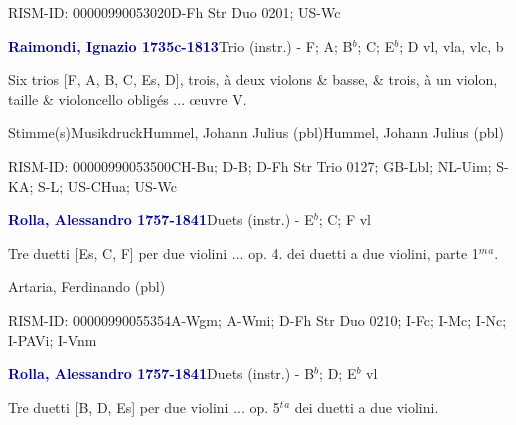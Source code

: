 \documentclass[twocolumn]{book}
\begin{document}
\par RISM-ID: 00000990053020\newline D-Fh  Str Duo 0201; US-Wc
\par \vspace{7pt} \textcolor{darkblue}{\textbf{Raimondi, Ignazio  1735c-1813}}\hfillplus{\textbf{[318]}}\newline Trio (instr.) - F; A; B$^b$; C; E$^b$; D vl, vla, vlc, b
\par \begin{itshape}Six trios [F, A, B, C, Es, D], trois, à deux violons \& basse, \& trois, à un violon, taille \& violoncello obligés ... œuvre V.\end{itshape} 
\par \textcolor{darkblue}{}  Stimme(s)\newline Musikdruck\newline Hummel, Johann Julius  (pbl)\newline Hummel, Johann Julius  (pbl)
\par RISM-ID: 00000990053500\newline CH-Bu; D-B; D-Fh  Str Trio 0127; GB-Lbl; NL-Uim; S-KA; S-L; US-CHua; US-Wc
\par \vspace{7pt} \textcolor{darkblue}{\textbf{Rolla, Alessandro  1757-1841}}\hfillplus{\textbf{[319]}}\newline Duets (instr.) - E$^b$; C; F vl
\par \begin{itshape}Tre duetti [Es, C, F] per due violini ... op. 4. dei duetti a due violini, parte 1$^m$$^a$.\end{itshape} \newline Artaria, Ferdinando  (pbl)
\par RISM-ID: 00000990055354\newline A-Wgm; A-Wmi; D-Fh  Str Duo 0210; I-Fc; I-Mc; I-Nc; I-PAVi; I-Vnm
\par \vspace{7pt} \textcolor{darkblue}{\textbf{Rolla, Alessandro  1757-1841}}\hfillplus{\textbf{[320]}}\newline Duets (instr.) - B$^b$; D; E$^b$ vl
\par \begin{itshape}Tre duetti [B, D, Es] per due violini ... op. 5$^t$$^a$ dei duetti a due violini.\end{itshape} 
\end{document}
